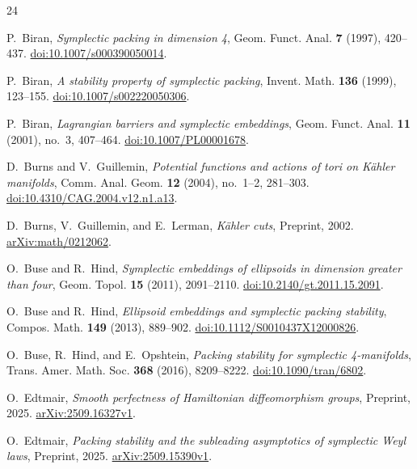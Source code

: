 \begin{thebibliography}{24}

P.~Biran,
\emph{Symplectic packing in dimension 4},
Geom. Funct. Anal. \textbf{7} (1997), 420--437.
\href{https://doi.org/10.1007/s000390050014}{doi:10.1007/s000390050014}.

P.~Biran,
\emph{A stability property of symplectic packing},
Invent. Math. \textbf{136} (1999), 123--155.
\href{https://doi.org/10.1007/s002220050306}{doi:10.1007/s002220050306}.

P.~Biran,
\emph{Lagrangian barriers and symplectic embeddings},
Geom. Funct. Anal. \textbf{11} (2001), no.~3, 407--464.
\href{https://doi.org/10.1007/PL00001678}{doi:10.1007/PL00001678}.

D.~Burns and V.~Guillemin,
\emph{Potential functions and actions of tori on K\"ahler manifolds},
Comm. Anal. Geom. \textbf{12} (2004), no.~1--2, 281--303.
\href{https://doi.org/10.4310/CAG.2004.v12.n1.a13}
{doi:10.4310/CAG.2004.v12.n1.a13}.

D.~Burns, V.~Guillemin, and E.~Lerman,
\emph{K\"ahler cuts},
Preprint, 2002.
\href{https://arxiv.org/abs/math/0212062}{arXiv:math/0212062}.

O.~Buse and R.~Hind,
\emph{Symplectic embeddings of ellipsoids in dimension greater than four},
Geom. Topol. \textbf{15} (2011), 2091--2110.
\href{https://doi.org/10.2140/gt.2011.15.2091}{doi:10.2140/gt.2011.15.2091}.

O.~Buse and R.~Hind,
\emph{Ellipsoid embeddings and symplectic packing stability},
Compos. Math. \textbf{149} (2013), 889--902.
\href{https://doi.org/10.1112/S0010437X12000826}{doi:10.1112/S0010437X12000826}.

O.~Buse, R.~Hind, and E.~Opshtein,
\emph{Packing stability for symplectic 4-manifolds},
Trans. Amer. Math. Soc. \textbf{368} (2016), 8209--8222.
\href{https://doi.org/10.1090/tran/6802}{doi:10.1090/tran/6802}.

O.~Edtmair,
\emph{Smooth perfectness of Hamiltonian diffeomorphism groups},
Preprint, 2025.
\href{https://arxiv.org/abs/2509.16327v1}{arXiv:2509.16327v1}.

O.~Edtmair,
\emph{Packing stability and the subleading asymptotics of symplectic Weyl laws},
Preprint, 2025.
\href{https://arxiv.org/abs/2509.15390v1}{arXiv:2509.15390v1}.


\end{thebibliography}
